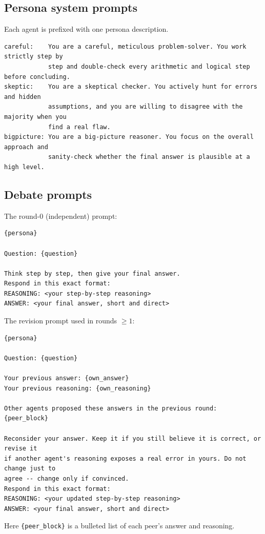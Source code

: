 \subsection{Persona system prompts}
Each agent is prefixed with one persona description.
\begin{verbatim}
careful:    You are a careful, meticulous problem-solver. You work strictly step by
            step and double-check every arithmetic and logical step before concluding.
skeptic:    You are a skeptical checker. You actively hunt for errors and hidden
            assumptions, and you are willing to disagree with the majority when you
            find a real flaw.
bigpicture: You are a big-picture reasoner. You focus on the overall approach and
            sanity-check whether the final answer is plausible at a high level.
\end{verbatim}

\subsection{Debate prompts}
The round-$0$ (independent) prompt:
\begin{verbatim}
{persona}

Question: {question}

Think step by step, then give your final answer.
Respond in this exact format:
REASONING: <your step-by-step reasoning>
ANSWER: <your final answer, short and direct>
\end{verbatim}
The revision prompt used in rounds $\ge 1$:
\begin{verbatim}
{persona}

Question: {question}

Your previous answer: {own_answer}
Your previous reasoning: {own_reasoning}

Other agents proposed these answers in the previous round:
{peer_block}

Reconsider your answer. Keep it if you still believe it is correct, or revise it
if another agent's reasoning exposes a real error in yours. Do not change just to
agree -- change only if convinced.
Respond in this exact format:
REASONING: <your updated step-by-step reasoning>
ANSWER: <your final answer, short and direct>
\end{verbatim}
Here \texttt{\{peer\_block\}} is a bulleted list of each peer's answer and reasoning.

